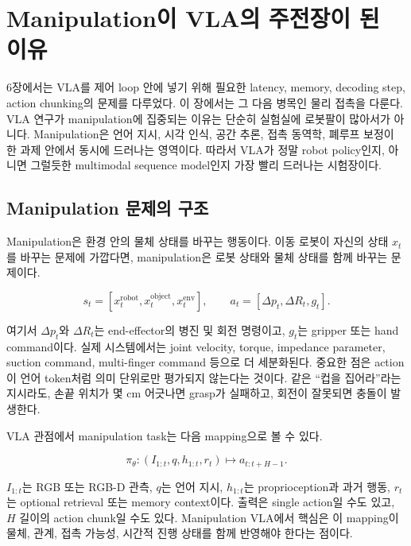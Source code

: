 \chapter{Manipulation이 VLA의 주전장이 된 이유}
\label{ch:manipulation}

6장에서는 VLA를 제어 loop 안에 넣기 위해 필요한 latency, memory, decoding step, action chunking의 문제를 다루었다. 이 장에서는 그 다음 병목인 물리 접촉을 다룬다. VLA 연구가 manipulation에 집중되는 이유는 단순히 실험실에 로봇팔이 많아서가 아니다. Manipulation은 언어 지시, 시각 인식, 공간 추론, 접촉 동역학, 폐루프 보정이 한 과제 안에서 동시에 드러나는 영역이다. 따라서 VLA가 정말 robot policy인지, 아니면 그럴듯한 multimodal sequence model인지 가장 빨리 드러나는 시험장이다.

\section{Manipulation 문제의 구조}

Manipulation은 환경 안의 물체 상태를 바꾸는 행동이다. 이동 로봇이 자신의 상태 $x_t$를 바꾸는 문제에 가깝다면, manipulation은 로봇 상태와 물체 상태를 함께 바꾸는 문제이다.

\begin{equation}
  s_t =
  \left[
    x_t^{\mathrm{robot}},
    x_t^{\mathrm{object}},
    x_t^{\mathrm{env}}
  \right],
  \qquad
  a_t =
  \left[
    \Delta p_t,
    \Delta R_t,
    g_t
  \right].
\end{equation}

여기서 $\Delta p_t$와 $\Delta R_t$는 end-effector의 병진 및 회전 명령이고, $g_t$는 gripper 또는 hand command이다. 실제 시스템에서는 joint velocity, torque, impedance parameter, suction command, multi-finger command 등으로 더 세분화된다. 중요한 점은 action이 언어 token처럼 의미 단위로만 평가되지 않는다는 것이다. 같은 ``컵을 집어라''라는 지시라도, 손끝 위치가 몇 cm 어긋나면 grasp가 실패하고, 회전이 잘못되면 충돌이 발생한다.

VLA 관점에서 manipulation task는 다음 mapping으로 볼 수 있다.

\begin{equation}
  \pi_\theta:
  \left(
    I_{1:t},
    q,
    h_{1:t},
    r_t
  \right)
  \mapsto
  a_{t:t+H-1}.
\end{equation}

$I_{1:t}$는 RGB 또는 RGB-D 관측, $q$는 언어 지시, $h_{1:t}$는 proprioception과 과거 행동, $r_t$는 optional retrieval 또는 memory context이다. 출력은 single action일 수도 있고, $H$ 길이의 action chunk일 수도 있다. Manipulation VLA에서 핵심은 이 mapping이 물체, 관계, 접촉 가능성, 시간적 진행 상태를 함께 반영해야 한다는 점이다.

